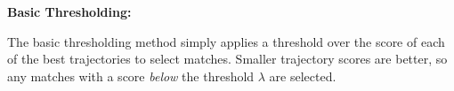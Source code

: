 \parbox{\textwidth}{\textbf{Basic Thresholding:}} \smallskip
\parbox{\textwidth}{The basic thresholding method simply applies a threshold over the score of each of the best trajectories to select matches. Smaller trajectory scores are better, so any matches with a score \textit{below} the threshold $\lambda$ are selected.}
\smallskip
